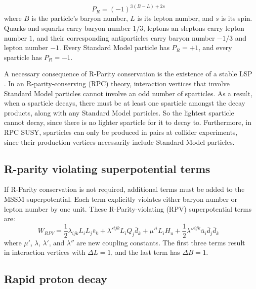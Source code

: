 \begin{equation}\label{eq:r_parity_def}
    P_R = \left(-1\right)^{3\left(B-L\right)+2s}
\end{equation}
where $B$ is the particle's baryon number, $L$ is its lepton number, and $s$ is its spin.
Quarks and squarks carry baryon number $1/3$, leptons an sleptons carry lepton number $1$, and their corresponding antiparticles carry baryon number $-1/3$ and lepton number $-1$.
Every Standard Model particle has $P_R = +1$, and every sparticle has $P_R = -1$.

A necessary consequence of R-Parity conservation is the existence of a stable LSP .
In an R-parity-conserving (RPC) theory, interaction vertices that involve Standard Model particles cannot involve an odd number of sparticles.
As a result, when a sparticle decays, there must be at least one sparticle amongst the decay products, along with any Standard Model particles.
So the lightest sparticle cannot decay, since there is no lighter sparticle for it to decay to.
Furthermore, in RPC SUSY, sparticles can only be produced in pairs at collider experiments, since their production vertices necessarily include Standard Model particles.

\subsection{R-parity violating superpotential terms}\label{subsec:rpv}

If R-Parity conservation is not required, additional terms must be added to the MSSM superpotential.
Each term explicitly violates either baryon number or lepton number by one unit.
These R-Parity-violating (RPV) superpotential terms are:
\begin{equation}\label{eq:rpv_superpotential}
    W_{RPV} = \frac{1}{2} \lambda_{ijk} L_i L_j \bar{e}_k
    + \lambda'^{ijk} L_i Q_j \bar{d}_k + \mu'^i L_i H_u
    + \frac{1}{2} \lambda''^{ijk} \bar{u}_i \bar{d}_j \bar{d}_k
\end{equation}
where $\mu'$, $\lambda$, $\lambda'$, and $\lambda''$ are new coupling constants.
The first three terms result in interaction vertices with $\Delta L = 1$, and the last term has $\Delta B = 1$.

\subsection{Rapid proton decay}\label{subsec:proton_decay}


